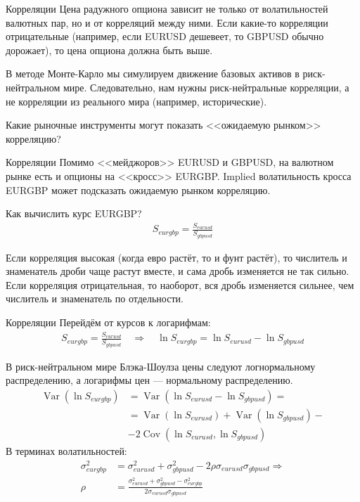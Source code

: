 \documentclass{beamer}
\begin{document}
\begin{frame}{Корреляции}
\justify
Цена радужного опциона зависит не только от волатильностей валютных пар, но и от корреляций между ними. Если какие-то корреляции отрицательные (например, если EURUSD дешевеет, то GBPUSD обычно дорожает), то цена опциона должна быть выше.

\justify
В методе Монте-Карло мы симулируем движение базовых активов в риск-нейтральном мире. Следовательно, нам нужны риск-нейтральные корреляции, а не корреляции из реального мира (например, исторические).

\justify
Какие рыночные инструменты могут показать <<ожидаемую рынком>> корреляцию?
\end{frame}



\begin{frame}{Корреляции}
\justify
Помимо <<мейджоров>> EURUSD и GBPUSD, на валютном рынке есть и опционы на <<кросс>> EURGBP. Implied волатильность кросса EURGBP может подсказать ожидаемую рынком корреляцию.

\justify
Как вычислить курс EURGBP?
\begin{align*}
S_{eurgbp} = \frac{S_{eurusd}}{S_{gbpusd}}
\end{align*}

\justify
Если корреляция высокая (когда евро растёт, то и фунт растёт), то числитель и знаменатель дроби чаще растут вместе, и сама дробь изменяется не так сильно. Если корреляция отрицательная, то наоборот, вся дробь изменяется сильнее, чем числитель и знаменатель по отдельности.
\end{frame}


\newcommand{\Var}{\operatorname{Var}}
\newcommand{\Cov}{\operatorname{Cov}}

\begin{frame}{Корреляции}
\justify
Перейдём от курсов к логарифмам:
\begin{align*}
S_{eurgbp} = \frac{S_{eurusd}}{S_{gbpusd}} \quad \Rightarrow \quad \ln S_{eurgbp} = \ln S_{eurusd} - \ln S_{gbpusd} 
\end{align*}

\justify
В риск-нейтральном мире Блэка-Шоулза цены следуют логнормальному распределению, а логарифмы цен --- нормальному распределению.
\begin{align*}
\Var(\ln S_{eurgbp}) &= \Var(\ln S_{eurusd} - \ln S_{gbpusd}) = \\
&= \Var(\ln S_{eurusd}) + \Var(\ln S_{gbpusd}) - \\
&- 2\Cov(\ln S_{eurusd}, \ln S_{gbpusd})
\end{align*}
В терминах волатильностей:
\begin{align*}
\sigma_{eurgbp}^2 &= \sigma_{eurusd}^2 + \sigma_{gbpusd}^2 - 2\rho\sigma_{eurusd}\sigma_{gbpusd} \Rightarrow \\
\rho &= \frac{\sigma_{eurusd}^2 + \sigma_{gbpusd}^2 - \sigma_{eurgbp}^2}{2\sigma_{eurusd}\sigma_{gbpusd}}
\end{align*}
\end{frame}
\end{document}
